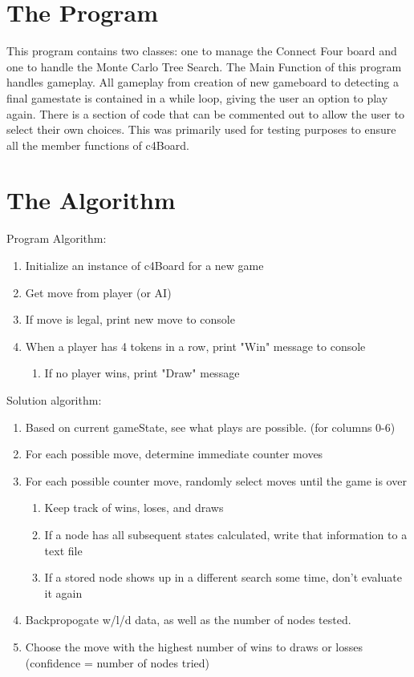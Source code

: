 \documentclass[fleqn]{article}
\begin{document}
  \section{The Program}
  This program contains two classes: one to manage the Connect Four board and one to handle the Monte Carlo Tree Search. The Main Function of this program handles gameplay. All gameplay from creation of new gameboard to detecting a final gamestate is contained in a while loop, giving the user an option to play again. There is a section of code that can be commented out to allow the user to select their own choices. This was primarily used for testing purposes to ensure all the member functions of c4Board.

  \section{The Algorithm}
  Program Algorithm:
  \begin{enumerate}
    \item Initialize an instance of c4Board for a new game
    \item Get move from player (or AI)
    \item If move is legal, print new move to console
    \item When a player has 4 tokens in a row, print "Win" message to console
    \begin{enumerate}
      \item If no player wins, print "Draw" message \\
    \end{enumerate}
  \end{enumerate}

  Solution algorithm:
  \begin{enumerate}
    \item Based on current gameState, see what plays are possible. (for columns 0-6)
    \item For each possible move, determine immediate counter moves
    \item For each possible counter move, randomly select moves until the game is over
    \begin{enumerate}
      \item Keep track of wins, loses, and draws
      \item If a node has all subsequent states calculated, write that information to a text file
      \item If a stored node shows up in a different search some time, don't evaluate it again
    \end{enumerate}
    \item Backpropogate w/l/d data, as well as the number of nodes tested.
    \item Choose the move with the highest number of wins to draws or losses (confidence = number of nodes tried)
  \end{enumerate}
\end{document}
